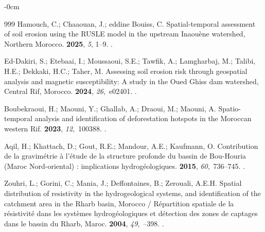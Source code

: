 \documentclass[geomatics,article,accept,pdftex,oneauthor]{Definitions/mdpi}
\begin{document}
\begin{adjustwidth}{-\extralength}{0cm}
\begin{thebibliography}{999}
Hamouch, C.; Chaaouan, J.; eddine Bouiss, C.
\newblock Spatial-temporal assessment of soil erosion using the RUSLE model in
  the upstream Inaou{\`e}ne watershed, Northern Morocco.
 {\bf 2025}, \emph{5}, 1--9.
.

Ed-Dakiri, S.; Etebaai, I.; Moussaoui, S.E.; Tawfik, A.; Lamgharbaj, M.;
  Talibi, H.E.; Dekkaki, H.C.; Taher, M.
\newblock Assessing soil erosion risk through geospatial analysis and magnetic
  susceptibility: A study in the Oued Ghiss dam watershed, Central Rif,
  Morocco.
 {\bf 2024}, {\em 26},~e02401.
.

Boubekraoui, H.; Maouni, Y.; Ghallab, A.; Draoui, M.; Maouni, A.
\newblock Spatio-temporal analysis and identification of deforestation hotspots
  in the Moroccan western Rif.
 {\bf 2023}, {\em 12},~100388.
.

Aqil, H.; Khattach, D.; Gout, R.E.; Mandour, A.E.; Kaufmann, O.
\newblock Contribution de la gravimétrie à l’étude de la structure
  profonde du bassin de Bou-Houria (Maroc Nord-oriental) : implications
  hydrogéologiques.
 {\bf 2015}, {\em 60},~736--745.
.

Zouhri, L.; Gorini, C.; Mania, J.; Deffontaines, B.; Zerouali, A.E.H.
\newblock Spatial distribution of resistivity in the hydrogeological systems,
  and identification of the catchment area in the Rharb basin, Morocco /
  Répartition spatiale de la résistivité dans les systèmes
  hydrogéologiques et détection des zones de captages dans le bassin du
  Rharb, Maroc.
 {\bf 2004}, {\em 49},~--398.
.


\end{thebibliography}
\end{adjustwidth}
\end{document}
